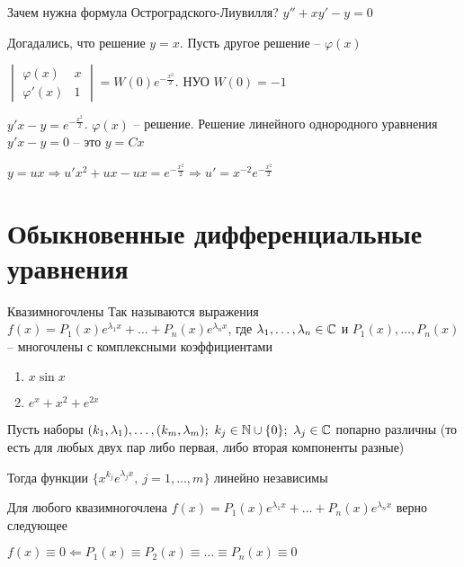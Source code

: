 \documentclass[12pt]{article}
\begin{document}
\begin{Remark}{Зачем нужна формула Остроградского-Лиувилля?}
    $y'' + xy' - y = 0$

    Догадались, что решение $y = x$. Пусть другое решение -- $\varphi(x)$

    $\begin{vmatrix}
        \varphi(x) & x \\
        \varphi'(x) & 1
    \end{vmatrix} = W(0) e^{-\frac{x^2}{2}}$. НУО $W(0) = -1$

    $y'x - y = e^{-\frac{x^2}{2}}$. $\varphi(x)$ -- решение. Решение линейного однородного уравнения $y'x - y = 0$ -- это $y = Cx$

    $y = ux \Rightarrow u'x^2 + ux - ux = e^{-\frac{x^2}{2}} \Rightarrow u' = x^{-2} e^{-\frac{x^2}{2}}$
\end{Remark}

\newpage 

\section{Обыкновенные дифференциальные уравнения}

\begin{defin}{Квазимногочлены}
    Так называются выражения $f(x) = P_1(x)e^{\lambda_1x} + \ldots + P_n(x)e^{\lambda_nx}$, где $\lambda_1, \ldots, \lambda_n \in \mathbb C$ и $P_1(x), \ldots, P_n(x)$ -- многочлены с комплексными коэффициентами
\end{defin}

\begin{Example}{}
    \begin{enumerate}
        \item $x\sin x$
        \item $e^x + x^2 + e^{2x}$
    \end{enumerate}
\end{Example}

\begin{lem}{}
    Пусть наборы $(k_1, \lambda_1), \ldots, (k_m, \lambda_m);\ k_j \in \mathbb N \cup \{0\};\ \lambda_j \in \mathbb C$ попарно различны (то есть для любых двух пар либо первая, либо вторая компоненты разные)
    
    Тогда функции $\{x^{k_j}e^{\lambda_jx},\ j = 1, \ldots, m\}$ линейно независимы
\end{lem}

\begin{lem}{}
    Для любого квазимногочлена $f(x) = P_1(x)e^{\lambda_1x} + \ldots + P_n(x)e^{\lambda_nx}$ верно следующее

    $f(x) \equiv 0 \Leftarrow P_1(x) \equiv P_2(x) \equiv \ldots \equiv P_n(x) \equiv 0$
\end{lem}
\end{document}
